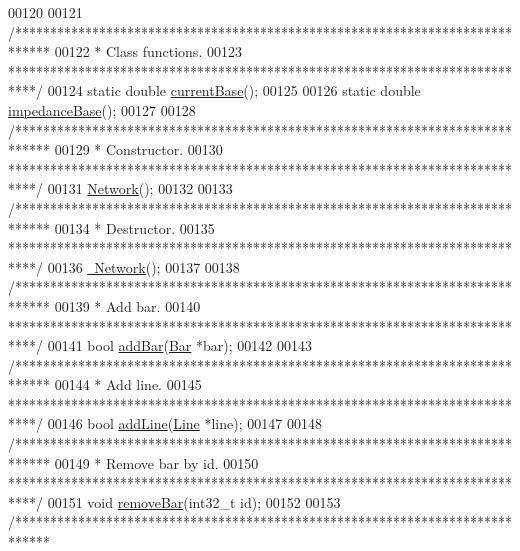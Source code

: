 \begin{DoxyCode}
00120 
00121   \textcolor{comment}{/*****************************************************************************}
00122 \textcolor{comment}{   * Class functions.}
00123 \textcolor{comment}{   ****************************************************************************/}
00124   \textcolor{keyword}{static} \textcolor{keywordtype}{double} \hyperlink{class_network_a8aa668b172d3706c8c9ac756d6e94d20}{currentBase}();
00125 
00126   \textcolor{keyword}{static} \textcolor{keywordtype}{double} \hyperlink{class_network_a8e0229acc4a5d5ac6ffadb5dc64cc7aa}{impedanceBase}();
00127 
00128   \textcolor{comment}{/*****************************************************************************}
00129 \textcolor{comment}{   * Constructor.}
00130 \textcolor{comment}{   ****************************************************************************/}
00131   \hyperlink{group___graphics_ga3cc2fb4f8fa4d507077e8da85ce5a1c8}{Network}();
00132 
00133   \textcolor{comment}{/*****************************************************************************}
00134 \textcolor{comment}{   * Destructor.}
00135 \textcolor{comment}{   ****************************************************************************/}
00136   \hyperlink{group___graphics_ga7a4e19cdb4bf0c7ecf82baa643831492}{~Network}();
00137 
00138   \textcolor{comment}{/*****************************************************************************}
00139 \textcolor{comment}{   * Add bar.}
00140 \textcolor{comment}{   ****************************************************************************/}
00141   \textcolor{keywordtype}{bool} \hyperlink{group___graphics_ga8c5dfef0216731246f7411e1a5fbee01}{addBar}(\hyperlink{class_bar}{Bar} *bar);
00142 
00143   \textcolor{comment}{/*****************************************************************************}
00144 \textcolor{comment}{   * Add line.}
00145 \textcolor{comment}{   ****************************************************************************/}
00146   \textcolor{keywordtype}{bool} \hyperlink{group___graphics_gae02945131494987b3ff9b59b627719b4}{addLine}(\hyperlink{class_line}{Line} *line);
00147 
00148   \textcolor{comment}{/*****************************************************************************}
00149 \textcolor{comment}{   * Remove bar by id.}
00150 \textcolor{comment}{   ****************************************************************************/}
00151   \textcolor{keywordtype}{void} \hyperlink{group___graphics_ga997ce4f03d316b9f138f2e64e6ca400c}{removeBar}(int32\_t \textcolor{keywordtype}{id});
00152 
00153   \textcolor{comment}{/*****************************************************************************}

\end{DoxyCode}
